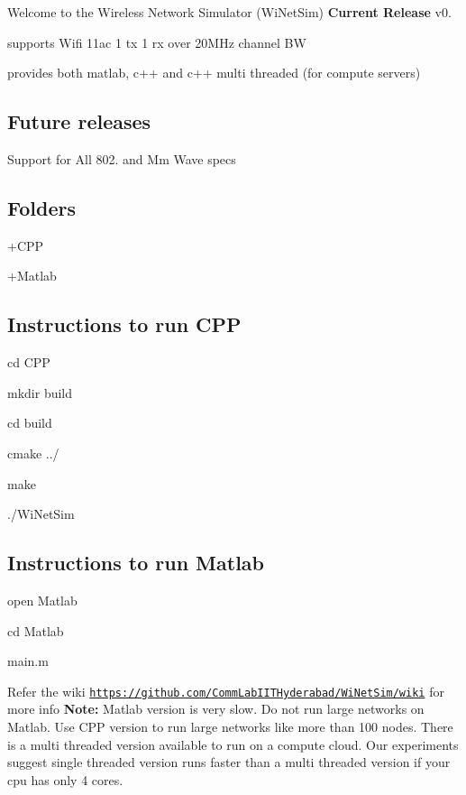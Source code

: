 Welcome to the Wireless Network Simulator (Wi\-Net\-Sim) {\bfseries Current Release} {\ttfamily v0.}

supports Wifi 11ac 1 tx 1 rx over 20\-M\-Hz channel B\-W

provides both matlab, c++ and c++ multi threaded (for compute servers)

\subsection*{Future releases}

Support for All 802. and Mm Wave specs

\subsection*{Folders}

+\-C\-P\-P

+\-Matlab

\subsection*{Instructions to run C\-P\-P}

{\ttfamily cd C\-P\-P}

{\ttfamily mkdir build}

{\ttfamily cd build}

{\ttfamily cmake ../}

{\ttfamily make}

{\ttfamily ./\-Wi\-Net\-Sim}

\subsection*{Instructions to run Matlab}

open Matlab

{\ttfamily cd Matlab}

{\ttfamily main.\-m}

Refer the wiki \href{https://github.com/CommLabIITHyderabad/WiNetSim/wiki}{\tt https\-://github.\-com/\-Comm\-Lab\-I\-I\-T\-Hyderabad/\-Wi\-Net\-Sim/wiki} for more info {\bfseries Note\-:} Matlab version is very slow. Do not run large networks on Matlab. Use C\-P\-P version to run large networks like more than 100 nodes. There is a multi threaded version available to run on a compute cloud. Our experiments suggest single threaded version runs faster than a multi threaded version if your cpu has only 4 cores. 